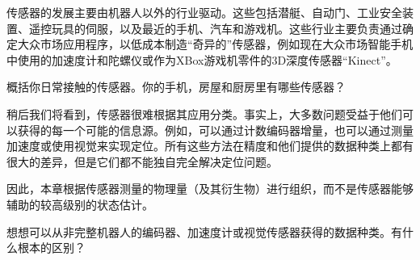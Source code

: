 传感器的发展主要由机器人以外的行业驱动。这些包括潜艇、自动门、工业安全装置、遥控玩具的伺服，以及最近的手机、汽车和游戏机。这些行业主要负责通过确定大众市场应用程序，以低成本制造“奇异的”传感器，例如现在大众市场智能手机中使用的加速度计和陀螺仪或作为XBox游戏机零件的3D深度传感器“Kinect”。

\begin{framed}

概括你日常接触的传感器。你的手机，房屋和厨房里有哪些传感器？
\end{framed}



稍后我们将看到，传感器很难根据其应用分类。事实上，大多数问题受益于他们可以获得的每一个可能的信息源。例如，可以通过计数编码器增量，也可以通过测量加速度或使用视觉来实现定位。所有这些方法在精度和他们提供的数据种类上都有很大的差异，但是它们都不能独自完全解决定位问题。


因此，本章根据传感器测量的物理量（及其衍生物）进行组织，而不是传感器能够辅助的较高级别的状态估计。

\begin{framed}

想想可以从非完整机器人的编码器、加速度计或视觉传感器获得的数据种类。有什么根本的区别？
\end{framed}

